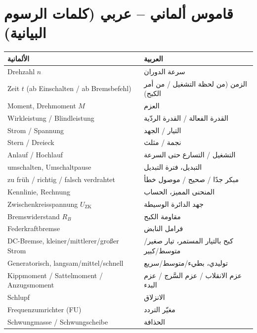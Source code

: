 \documentclass[11pt,a4paper]{article}
\newcommand{\dt}[1]{\textgerman{#1}}
\begin{document}
\section{قاموس ألماني – عربي (كلمات الرسوم البيانية)}
\label{sec:lexique}
\begin{center}
\begin{tabular}{@{}p{}p{}@{}}
\toprule
الألمانية & العربية\\
\midrule
\dt{Drehzahl $n$} & سرعة الدوران\\
\dt{Zeit $t$ (ab Einschalten / ab Bremsbefehl)} & الزمن (من لحظة التشغيل / من أمر الكبح)\\
\dt{Moment, Drehmoment $M$} & العزم\\
\dt{Wirkleistung / Blindleistung} & القدرة الفعالة / القدرة الردّية\\
\dt{Strom / Spannung} & التيار / الجهد\\
\dt{Stern / Dreieck} & نجمة / مثلث\\
\dt{Anlauf / Hochlauf} & التشغيل / التسارع حتى السرعة\\
\dt{umschalten, Umschaltpause} & التبديل، فترة التبديل\\
\dt{zu früh / richtig / falsch verdrahtet} & مبكر جدًا / صحيح / موصول خطأ\\
\dt{Kennlinie, Rechnung} & المنحنى المميز، الحساب\\
\dt{Zwischenkreisspannung $U_\mathrm{ZK}$} & جهد الدائرة الوسيطة\\
\dt{Bremswiderstand $R_B$} & مقاومة الكبح\\
\dt{Federkraftbremse} & فرامل النابض\\
\dt{DC-Bremse, kleiner/mittlerer/großer Strom} & كبح بالتيار المستمر، تيار صغير/متوسط/كبير\\
\dt{Generatorisch, langsam/mittel/schnell} & توليدي، بطيء/متوسط/سريع\\
\dt{Kippmoment / Sattelmoment / Anzugsmoment} & عزم الانقلاب / عزم السَّرج / عزم البدء\\
\dt{Schlupf} & الانزلاق\\
\dt{Frequenzumrichter (FU)} & مغيّر التردد\\
\dt{Schwungmasse / Schwungscheibe} & الحذافة\\
\bottomrule
\end{tabular}
\end{center}
\end{document}
